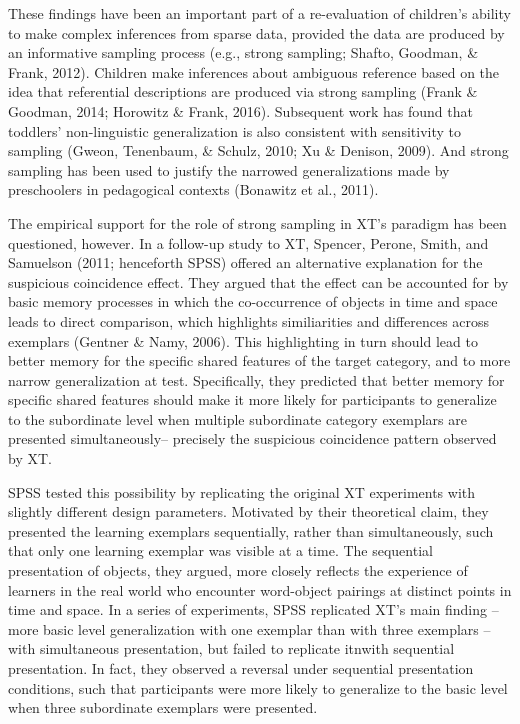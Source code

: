 \documentclass[english,floatsintext,man]{apa6}
\theoremstyle{definition}
\theoremstyle{definition}
\theoremstyle{definition}
\theoremstyle{remark}
\begin{document}
These findings have been an important part of a re-evaluation of
children's ability to make complex inferences from sparse data, provided
the data are produced by an informative sampling process (e.g., strong
sampling; Shafto, Goodman, \& Frank, 2012). Children make inferences
about ambiguous reference based on the idea that referential
descriptions are produced via strong sampling (Frank \& Goodman, 2014;
Horowitz \& Frank, 2016). Subsequent work has found that toddlers'
non-linguistic generalization is also consistent with sensitivity to
sampling (Gweon, Tenenbaum, \& Schulz, 2010; Xu \& Denison, 2009). And
strong sampling has been used to justify the narrowed generalizations
made by preschoolers in pedagogical contexts (Bonawitz et al., 2011).

The empirical support for the role of strong sampling in XT's paradigm
has been questioned, however. In a follow-up study to XT, Spencer,
Perone, Smith, and Samuelson (2011; henceforth SPSS) offered an
alternative explanation for the suspicious coincidence effect. They
argued that the effect can be accounted for by basic memory processes in
which the co-occurrence of objects in time and space leads to direct
comparison, which highlights similiarities and differences across
exemplars (Gentner \& Namy, 2006). This highlighting in turn should lead
to better memory for the specific shared features of the target
category, and to more narrow generalization at test. Specifically, they
predicted that better memory for specific shared features should make it
more likely for participants to generalize to the subordinate level when
multiple subordinate category exemplars are presented simultaneously--
precisely the suspicious coincidence pattern observed by XT.

SPSS tested this possibility by replicating the original XT experiments
with slightly different design parameters. Motivated by their
theoretical claim, they presented the learning exemplars sequentially,
rather than simultaneously, such that only one learning exemplar was
visible at a time. The sequential presentation of objects, they argued,
more closely reflects the experience of learners in the real world who
encounter word-object pairings at distinct points in time and space. In
a series of experiments, SPSS replicated XT's main finding -- more basic
level generalization with one exemplar than with three exemplars -- with
simultaneous presentation, but failed to replicate itnwith sequential
presentation. In fact, they observed a reversal under sequential
presentation conditions, such that participants were more likely to
generalize to the basic level when three subordinate exemplars were
presented.
\end{document}
